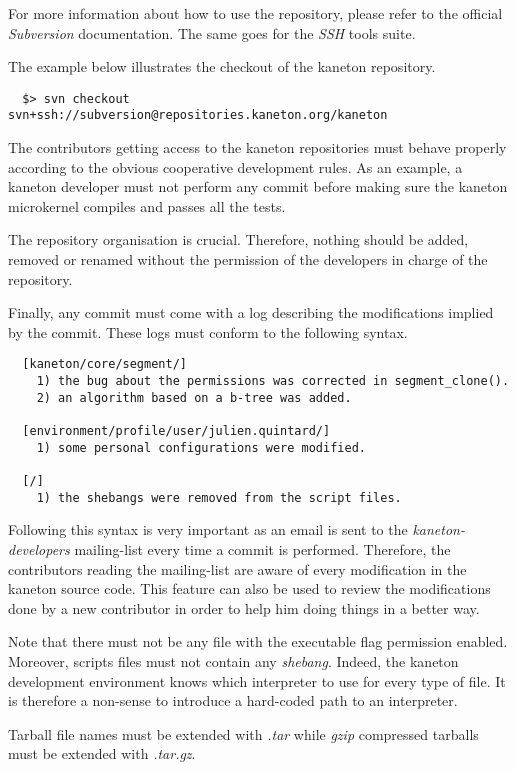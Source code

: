 For more information about how to use the repository, please refer to the
official \textit{Subversion} documentation. The same goes for the
\textit{SSH} tools suite.

The example below illustrates the checkout of the kaneton repository.

\begin{verbatim}
  $> svn checkout svn+ssh://subversion@repositories.kaneton.org/kaneton
\end{verbatim}

The contributors getting access to the kaneton repositories must behave
properly according to the obvious cooperative development rules. As an
example, a kaneton developer must not perform any commit before making sure
the kaneton microkernel compiles and passes all the tests.

The repository organisation is crucial. Therefore, nothing should be
added, removed or renamed without the permission of the developers in charge
of the repository.

Finally, any commit must come with a log describing the modifications
implied by the commit. These logs must conform to the following syntax.

\begin{verbatim}
  [kaneton/core/segment/]
    1) the bug about the permissions was corrected in segment_clone().
    2) an algorithm based on a b-tree was added.

  [environment/profile/user/julien.quintard/]
    1) some personal configurations were modified.

  [/]
    1) the shebangs were removed from the script files.
\end{verbatim}

Following this syntax is very important as an email is sent to the
\textit{kaneton-developers} mailing-list every time a commit is performed.
Therefore, the contributors reading the mailing-list are aware of every
modification in the kaneton source code. This feature can also be used
to review the modifications done by a new contributor in order to help
him doing things in a better way.

Note that there must not be any file with the executable flag permission
enabled. Moreover, scripts files must not contain any \textit{shebang}.
Indeed, the kaneton development environment knows which interpreter to
use for every type of file. It is therefore a non-sense to introduce a
hard-coded path to an interpreter.

Tarball file names must be extended with \textit{.tar} while \textit{gzip}
compressed tarballs must be extended with \textit{.tar.gz}.
